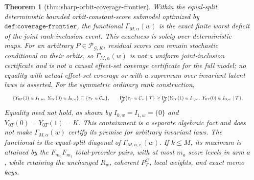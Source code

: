 \documentclass{article}
\newtheorem{theorem}{Theorem}
\begin{document}
\begin{theorem}[thm:sharp-orbit-coverage-frontier]\label{thm:sharp-orbit-coverage-frontier}
Within the equal-split deterministic bounded orbit-constant-score submodel optimized by \(\texttt{def:coverage-frontier}\), the functional \(\Gamma_{M,\alpha}(w)\) is the exact finite worst deficit of the joint rank-inclusion event. This exactness is solely over deterministic maps. For an arbitrary \(P\in\mathcal P_{\mathcal G,K}\), residual scores can remain stochastic conditional on their orbits, so \(\Gamma_{M,\alpha}(w)\) is not a uniform joint-inclusion certificate and is not a causal effect-set coverage certificate for the full model; no equality with actual effect-set coverage or with a supremum over invariant latent laws is asserted. For the symmetric ordinary rank construction,
\[
\makebox[\linewidth][c]{\resizebox{0.98\linewidth}{!}{\(\displaystyle \{Y_{0T}(1)\in I_{1,w},\ Y_{0T}(0)\in I_{0,w}\}
\subseteq
\{\tau_T\in\mathcal C_w\},
\qquad
\Pr_P\{\tau_T\in\mathcal C_w\mid\mathcal T\}
\ge
\Pr_P\{Y_{0T}(1)\in I_{1,w},\ Y_{0T}(0)\in I_{0,w}\mid\mathcal T\}.\)}}
\]
Equality need not hold, as shown by \(I_{0,w}=I_{1,w}=\{0\}\) and \(Y_{0T}(0)=Y_{0T}(1)=K\). This containment is a separate algebraic fact and does not make \(\Gamma_{M,\alpha}(w)\) certify its premise for arbitrary invariant laws. The functional is the equal-split diagonal of \(\Gamma_{M,\alpha,\boldsymbol\varepsilon}(w)\). If \(k\le M\), its maximum is attained by the \(F_{m_0}F_{m_1}\) total-preorder pairs, with at most \(m_a\) score levels in arm \(a\), while retaining the unchanged \(R_w\), coherent \(P_T^C\), local weights, and exact memo keys.


\end{theorem}
\end{document}
